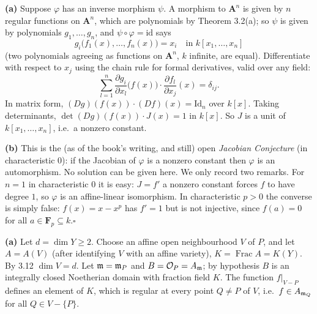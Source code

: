 \documentclass[11pt]{article}
\begin{document}
\pf
\textbf{(a)} Suppose $\varphi$ has an inverse morphism $\psi$. A morphism to $\mathbf A^n$ is given by $n$ regular functions on $\mathbf A^n$, which are polynomials by Theorem 3.2(a); so $\psi$ is given by polynomials $g_1,\dots,g_n$, and $\psi\circ\varphi=\mathrm{id}$ says
\[
g_i\bigl(f_1(x),\dots,f_n(x)\bigr)=x_i\quad\text{in }k[x_1,\dots,x_n]
\]
(two polynomials agreeing as functions on $\mathbf A^n$, $k$ infinite, are equal). Differentiate with respect to $x_j$ using the chain rule for formal derivatives, valid over any field:
\[
\sum_{l=1}^n\frac{\partial g_i}{\partial x_l}\bigl(f(x)\bigr)\cdot\frac{\partial f_l}{\partial x_j}(x)=\delta_{ij}.
\]
In matrix form, $(Dg)(f(x))\cdot(Df)(x)=\mathrm{Id}_n$ over $k[x]$. Taking determinants, $\det(Dg)(f(x))\cdot J(x)=1$ in $k[x]$. So $J$ is a unit of $k[x_1,\dots,x_n]$, i.e.\ a nonzero constant.

\textbf{(b)} This is the (as of the book's writing, and still) open \emph{Jacobian Conjecture} (in characteristic $0$): if the Jacobian of $\varphi$ is a nonzero constant then $\varphi$ is an automorphism. No solution can be given here. We only record two remarks. For $n=1$ in characteristic $0$ it is easy: $J=f'$ a nonzero constant forces $f$ to have degree $1$, so $\varphi$ is an affine-linear isomorphism. In characteristic $p>0$ the converse is simply false: $f(x)=x-x^p$ has $f'=1$ but is not injective, since $f(a)=0$ for all $a\in\mathbf F_p\subseteq k$.\hfill$\square$

\pf
\textbf{(a)} Let $d=\dim Y\ge2$. Choose an affine open neighbourhood $V$ of $P$, and let $A=A(V)$ (after identifying $V$ with an affine variety), $K=\operatorname{Frac}A=K(Y)$. By 3.12 $\dim V=d$. Let $\mathfrak m=\mathfrak m_P$ and $B=\mathcal{O}_P=A_\mathfrak m$; by hypothesis $B$ is an integrally closed Noetherian domain with fraction field $K$. The function $f|_{V-P}$ defines an element of $K$, which is regular at every point $Q\ne P$ of $V$, i.e.\ $f\in A_{\mathfrak m_Q}$ for all $Q\in V-\{P\}$.
\end{document}
